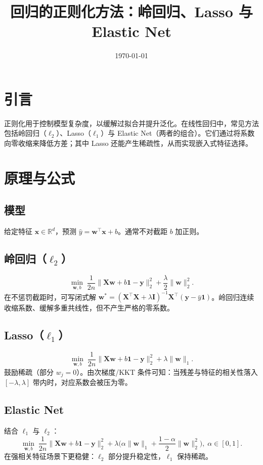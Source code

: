 \documentclass[UTF8,zihao=-4]{ctexart}
\title{回归的正则化方法：岭回归、Lasso 与 Elastic Net}
\author{}
\date{\today}
\begin{document}
\maketitle

\section{引言}
正则化用于控制模型复杂度，以缓解过拟合并提升泛化。在线性回归中，常见方法包括岭回归（\(\ell_2\)）、Lasso（\(\ell_1\)）与 Elastic Net（两者的组合）。它们通过将系数向零收缩来降低方差；其中 Lasso 还能产生稀疏性，从而实现嵌入式特征选择。

\section{原理与公式}
\subsection{模型}
给定特征 \(\mathbf{x}\in\mathbb{R}^d\)，预测 \(\hat{y}=\mathbf{w}^\top\mathbf{x}+b\)。通常不对截距 \(b\) 加正则。

\subsection{岭回归（\(\ell_2\)）}
\begin{equation}
\min_{\mathbf{w},b}\; \frac{1}{2n}\lVert \mathbf{X}\mathbf{w}+b\mathbf{1}-\mathbf{y} \rVert_2^2 + \frac{\lambda}{2}\lVert \mathbf{w} \rVert_2^2.
\end{equation}
在不惩罚截距时，可写闭式解 \(\mathbf{w}^*=(\mathbf{X}^\top\mathbf{X}+\lambda\mathbf{I})^{-1}\mathbf{X}^\top(\mathbf{y}-\bar{y}\mathbf{1})\)。岭回归连续收缩系数、缓解多重共线性，但不产生严格的零系数。

\subsection{Lasso（\(\ell_1\)）}
\begin{equation}
\min_{\mathbf{w},b}\; \frac{1}{2n}\lVert \mathbf{X}\mathbf{w}+b\mathbf{1}-\mathbf{y} \rVert_2^2 + \lambda \lVert \mathbf{w} \rVert_1.
\end{equation}
鼓励稀疏（部分 \(w_j=0\)）。由次梯度/KKT 条件可知：当残差与特征的相关性落入 \([-\lambda,\lambda]\) 带内时，对应系数会被压为零。

\subsection{Elastic Net}
结合 \(\ell_1\) 与 \(\ell_2\)：
\begin{equation}
\min_{\mathbf{w},b}\; \frac{1}{2n}\lVert \mathbf{X}\mathbf{w}+b\mathbf{1}-\mathbf{y} \rVert_2^2 + \lambda\Big(\alpha\lVert \mathbf{w} \rVert_1 + \frac{1-\alpha}{2}\lVert \mathbf{w} \rVert_2^2\Big),\; \alpha\in[0,1].
\end{equation}
在强相关特征场景下更稳健：\(\ell_2\) 部分提升稳定性，\(\ell_1\) 保持稀疏。
\end{document}
